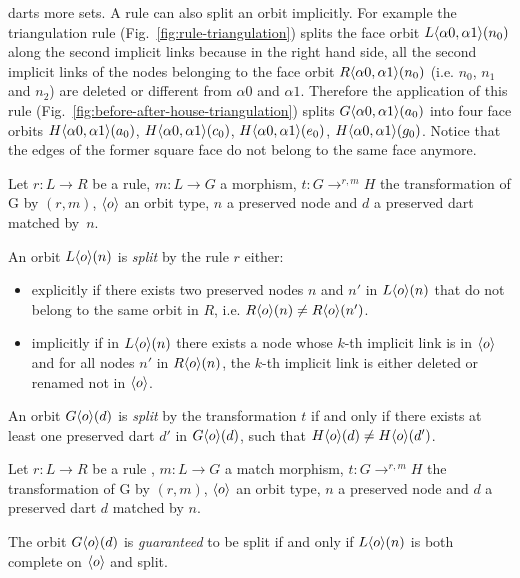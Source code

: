 \documentclass[../main.tex]{subfiles}
\begin{document}
darts %
more sets. A rule can also split an orbit implicitly. For example the
triangulation rule (Fig.~\ref{fig:rule-triangulation}) splits the face orbit
$L\langle\alpha 0, \alpha 1\rangle(n_{0})$ along the second implicit links because in
the right hand side, all the second implicit links of the nodes belonging to the
face orbit $R\langle\alpha 0, \alpha 1\rangle(n_{0})$ (i.e. $n_{0}$, $n_{1}$ and
$n_{2}$) are deleted or different from $\alpha 0$ and $\alpha 1$. Therefore the
application of this rule (Fig.~\ref{fig:before-after-house-triangulation})
splits $G\langle\alpha 0, \alpha 1\rangle(a_{0})$ into four face orbits
$H\langle\alpha 0, \alpha 1\rangle(a_{0})$, $H\langle\alpha 0, \alpha 1\rangle(c_{0})$,
$H\langle\alpha 0, \alpha 1\rangle(e_{0})$, $H\langle\alpha 0, \alpha 1\rangle(g_{0})$.
Notice that the edges of the former square face do not belong to the same face
anymore. 


\begin{definition}\label{def:orbit-split} Let
$r: L \longrightarrow R$ be a rule, $m: L \to G$ a morphism,
$t: G \longrightarrow^{r,m}H$ the transformation of G by $(r,m)$, $\langle o\rangle$ an
orbit type, $n$ a preserved node and $d$ a preserved dart matched by~$n$.

  An orbit $L\langle o\rangle(n)$ is \emph{split} by the rule $r$ either:
  \begin{itemize}
    \item explicitly if there exists two preserved nodes $n$ and $n'$ in
$L\langle o\rangle(n)$ that do not belong to the same orbit in $R$, i.e.
$R\langle o\rangle(n) \neq R\langle o\rangle(n')$.


    \item implicitly if in $L\langle o\rangle(n)$ there exists a node whose $k$-th
implicit link is in $\langle o\rangle$ and for all nodes $n'$ in $R\langle o\rangle(n)$, the
$k$-th implicit link is either deleted or renamed not in $\langle o\rangle$.
  \end{itemize}

  An orbit $G\langle o\rangle(d)$ is \emph{split} by the transformation $t$ if and only
if there exists at least one preserved dart $d'$ in $G\langle o\rangle(d)$, such that
$H\langle o\rangle(d) \neq H\langle o\rangle(d')$.
\end{definition}

\begin{proposition}\label{prop:orbit-split} Let $r : L \longrightarrow R$ be a
rule , $m : L \to G$ a match morphism, $t : G \longrightarrow^{r,m} H$ the
transformation of G by $(r, m)$, $\langle o\rangle$ an orbit type, $n$ a preserved node
and $d$ a preserved dart $d$ matched by $n$.

  The orbit $G\langle o\rangle(d)$ is \emph{guaranteed} to be split if and only if
$L\langle o\rangle(n)$ is both complete on $\langle o\rangle$ and split.
\end{proposition}
\end{document}
